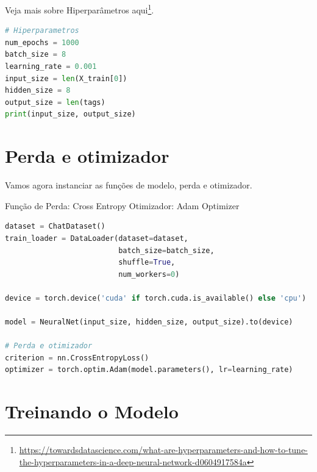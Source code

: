 Veja mais sobre Hiperparâmetros aqui\footnote{\url{https://towardsdatascience.com/what-are-hyperparameters-and-how-to-tune-the-hyperparameters-in-a-deep-neural-network-d0604917584a}}.




\begin{lstlisting}[language=Python, caption=Hiperparâmetros]
# Hiperparametros
num_epochs = 1000
batch_size = 8
learning_rate = 0.001
input_size = len(X_train[0])
hidden_size = 8
output_size = len(tags)
print(input_size, output_size)

\end{lstlisting}

\section[Perda e otimizador]{Perda e otimizador}

Vamos agora instanciar as funções de modelo, perda e otimizador.

Função de Perda: Cross Entropy
Otimizador: Adam Optimizer

\begin{lstlisting}[language=Python, caption=Perda e otimizador]
dataset = ChatDataset()
train_loader = DataLoader(dataset=dataset,
                          batch_size=batch_size,
                          shuffle=True,
                          num_workers=0)

device = torch.device('cuda' if torch.cuda.is_available() else 'cpu')

model = NeuralNet(input_size, hidden_size, output_size).to(device)

# Perda e otimizador
criterion = nn.CrossEntropyLoss()
optimizer = torch.optim.Adam(model.parameters(), lr=learning_rate)

\end{lstlisting}

\section[Treinando o Modelo]{Treinando o Modelo}

